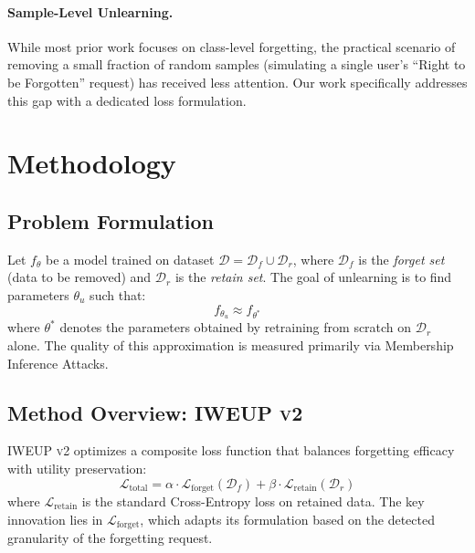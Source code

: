 \documentclass[11pt]{article}
\newcommand{\method}{\textsc{IWEUP v2}}
\newcommand{\Loss}{\mathcal{L}}
\begin{document}
\paragraph{Sample-Level Unlearning.}
While most prior work focuses on class-level forgetting, the practical scenario of removing a small fraction of random samples (simulating a single user's ``Right to be Forgotten'' request) has received less attention. Our work specifically addresses this gap with a dedicated loss formulation.

\section{Methodology}
\label{sec:methodology}

\subsection{Problem Formulation}
Let $f_\theta$ be a model trained on dataset $\mathcal{D} = \mathcal{D}_f \cup \mathcal{D}_r$, where $\mathcal{D}_f$ is the \textit{forget set} (data to be removed) and $\mathcal{D}_r$ is the \textit{retain set}. The goal of unlearning is to find parameters $\theta_u$ such that:
\begin{equation}
    f_{\theta_u} \approx f_{\theta^*}
\end{equation}
where $\theta^*$ denotes the parameters obtained by retraining from scratch on $\mathcal{D}_r$ alone. The quality of this approximation is measured primarily via Membership Inference Attacks.

\subsection{Method Overview: \method{}}
\method{} optimizes a composite loss function that balances forgetting efficacy with utility preservation:
\begin{equation}
    \Loss_{\text{total}} = \alpha \cdot \Loss_{\text{forget}}(\mathcal{D}_f) + \beta \cdot \Loss_{\text{retain}}(\mathcal{D}_r)
    \label{eq:total_loss}
\end{equation}
where $\Loss_{\text{retain}}$ is the standard Cross-Entropy loss on retained data. The key innovation lies in $\Loss_{\text{forget}}$, which adapts its formulation based on the detected granularity of the forgetting request.
\end{document}
